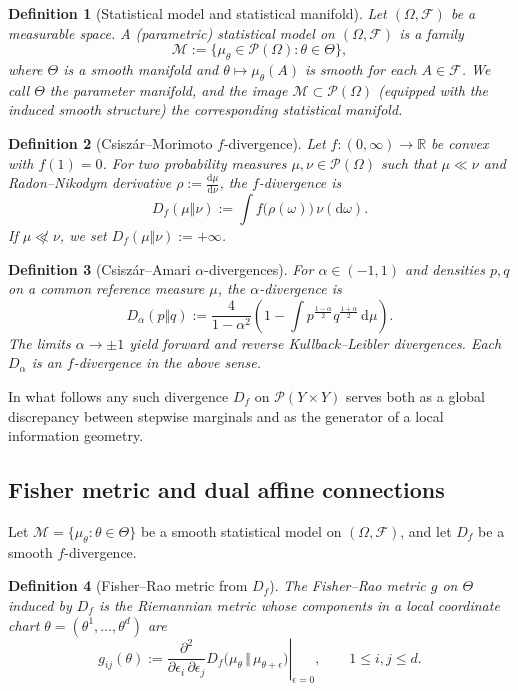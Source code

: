 \documentclass[11pt]{article}
\newtheorem{definition}{Definition}
\newcommand{\Pcal}{\mathcal{P}}
\newcommand{\Mcal}{\mathcal{M}}
\begin{document}
\begin{definition}[Statistical model and statistical manifold]
Let $(\Omega,\mathcal F)$ be a measurable space. A (parametric) \emph{statistical model}
on $(\Omega,\mathcal F)$ is a family
\[
  \Mcal
  := \{\mu_\theta \in \Pcal(\Omega) : \theta\in\Theta\},
\]
where $\Theta$ is a smooth manifold and $\theta\mapsto\mu_\theta(A)$ is smooth for each
$A\in\mathcal F$. We call $\Theta$ the \emph{parameter manifold}, and the image
$\mathcal M \subset \Pcal(\Omega)$ (equipped with the induced smooth structure) the
corresponding \emph{statistical manifold}.
\end{definition}

\begin{definition}[Csiszár--Morimoto $f$-divergence]
Let $f:(0,\infty)\to\mathbb{R}$ be convex with $f(1)=0$. For two
probability measures $\mu,\nu\in\mathcal{P}(\Omega)$ such that
$\mu\ll\nu$ and Radon--Nikodym derivative
$\rho := \frac{\mathrm d\mu}{\mathrm d\nu}$, the \emph{$f$-divergence} is
\[
  D_f(\mu\Vert\nu)
  :=
  \int f\bigl(\rho(\omega)\bigr)\,\nu(\mathrm d\omega).
\]
If $\mu\not\ll\nu$, we set $D_f(\mu\Vert\nu):=+\infty$.
\end{definition}

\begin{definition}[Csiszár--Amari $\alpha$-divergences]
For $\alpha\in(-1,1)$ and densities $p,q$ on a common reference measure
$\mu$, the \emph{$\alpha$-divergence} is
\[
  D_\alpha(p\Vert q)
  := \frac{4}{1-\alpha^2}
     \left(
       1 - \int p^{\frac{1-\alpha}{2}} q^{\frac{1+\alpha}{2}}\,\mathrm d\mu
     \right).
\]
The limits $\alpha\to\pm 1$ yield forward and reverse Kullback–Leibler
divergences. Each $D_\alpha$ is an $f$-divergence in the above sense.
\end{definition}

In what follows any such divergence $D_f$ on $\mathcal{P}(Y\times Y)$
serves both as a global discrepancy between stepwise marginals and as
the generator of a local information geometry.

\subsection{Fisher metric and dual affine connections}

Let $\Mcal = \{\mu_\theta : \theta\in\Theta\}$ be a smooth
statistical model on $(\Omega,\mathcal{F})$, and let $D_f$ be a smooth
$f$-divergence.

\begin{definition}[Fisher--Rao metric from $D_f$]
The \emph{Fisher--Rao metric} $g$ on $\Theta$ induced by $D_f$ is the
Riemannian metric whose components in a local coordinate chart
$\theta=(\theta^1,\dots,\theta^d)$ are
\[
  g_{ij}(\theta)
  :=
  \left.
  \frac{\partial^2}{\partial \epsilon_i\,\partial \epsilon_j}
  D_f\bigl(\mu_\theta \,\Vert\, \mu_{\theta+\epsilon}\bigr)
  \right|_{\epsilon=0},
  \qquad
  1\le i,j\le d.
\]
\end{definition}
\end{document}
